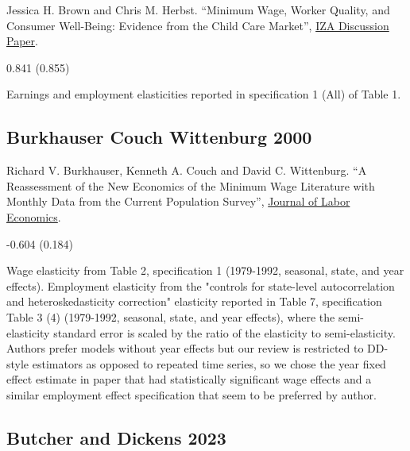 \noindent Jessica H. Brown and Chris M. Herbst. ``Minimum Wage, Worker Quality, and Consumer Well-Being: Evidence from the Child Care Market'', \href{https://docs.iza.org/dp16257.pdf}{IZA Discussion Paper}.

\vspace{0.7em}

 0.841 (0.855)

\vspace{0.7em}

 Earnings and employment elasticities reported in specification 1 (All) of Table 1.

\subsection*{Burkhauser Couch Wittenburg 2000}
\vspace{-0.7em}

\noindent Richard V. Burkhauser, Kenneth A. Couch and David C. Wittenburg. ``A Reassessment of the New Economics of the Minimum Wage Literature with Monthly Data from the Current Population Survey'', \href{https://doi.org/10.1086/209972}{Journal of Labor Economics}.

\vspace{0.7em}

 -0.604 (0.184)

\vspace{0.7em}

 Wage elasticity from Table 2, specification 1 (1979-1992, seasonal, state, and year effects). Employment elasticity from the "controls for state-level autocorrelation and heteroskedasticity correction" elasticity reported in Table 7, specification Table 3 (4) (1979-1992, seasonal, state, and year effects), where the semi-elasticity standard error is scaled by the ratio of the elasticity to semi-elasticity. Authors prefer models without year effects but our review is restricted to DD-style estimators as opposed to repeated time series, so we chose the year fixed effect estimate in paper that had statistically significant wage effects and a similar employment effect specification that seem to be preferred by author.

\subsection*{Butcher and Dickens 2023}
\vspace{-0.7em}

